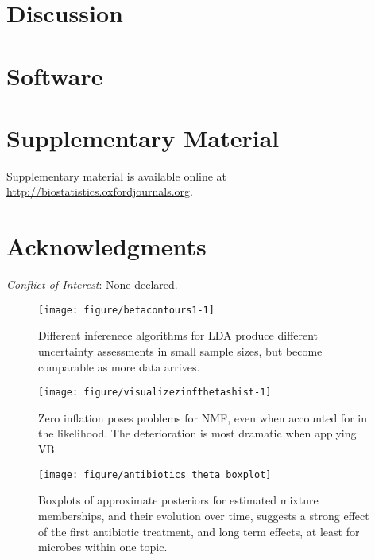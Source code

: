 \documentclass[oupdraft]{bio}
\begin{document}
\section{Discussion}


\section{Software}

\section{Supplementary Material}

Supplementary material is available online at
\url{http://biostatistics.oxfordjournals.org}.

\section*{Acknowledgments}

{\it Conflict of Interest}: None declared.




\begin{figure}[!p]
  \centering\texttt{[image: figure/betacontours1-1]}
  \caption{Different inferenece algorithms for LDA produce different uncertainty
    assessments in small sample sizes, but become comparable as more data arrives.}
  \label{fig:lda_contours}
\end{figure}

\begin{figure}[!p]
  \centering\texttt{[image: figure/visualizezinfthetashist-1]}
  \caption{Zero inflation poses problems for NMF, even when accounted for in the likelihood. The deterioration is most dramatic when applying VB.}
  \label{fig:zinf_thetas}
\end{figure}

\begin{figure}[!p]
  \centering\texttt{[image: figure/antibiotics\_theta\_boxplot]}
  \caption{Boxplots of approximate posteriors for estimated mixture memberships,
    and their evolution over time, suggests a strong effect of the first
    antibiotic treatment, and long term effects, at least for microbes within
    one topic.}
  \label{fig:antibiotics_lda_theta}
\end{figure}
\end{document}
